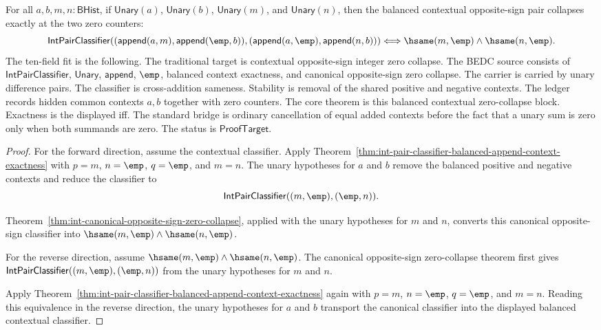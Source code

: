 \begin{theorem}
\label{thm:int-balanced-contextual-opposite-sign-zero-collapse}
For all $a,b,m,n:\mathsf{BHist}$, if $\mathsf{Unary}(a)$,
$\mathsf{Unary}(b)$, $\mathsf{Unary}(m)$, and $\mathsf{Unary}(n)$, then
the balanced contextual opposite-sign pair collapses exactly at the two zero
counters:
$$
\mathsf{IntPairClassifier}
((\mathsf{append}(a,m),\mathsf{append}(\emp,b)),
(\mathsf{append}(a,\emp),\mathsf{append}(n,b)))
\Longleftrightarrow
\hsame(m,\emp)\land\hsame(n,\emp).
$$
The ten-field fit is the following. The traditional target is contextual
opposite-sign integer zero collapse. The BEDC source consists of
$\mathsf{IntPairClassifier}$, $\mathsf{Unary}$, $\mathsf{append}$, $\emp$,
balanced context exactness, and canonical opposite-sign zero collapse. The
carrier is carried by unary difference pairs. The classifier is
cross-addition sameness. Stability is removal of the shared positive and
negative contexts. The ledger records hidden common contexts $a,b$ together
with zero counters. The core theorem is this balanced contextual zero-collapse
block. Exactness is the displayed iff. The standard bridge is ordinary
cancellation of equal added contexts before the fact that a unary sum is zero
only when both summands are zero. The status is $\mathsf{ProofTarget}$.
\end{theorem}
\begin{proof}
For the forward direction, assume the contextual classifier. Apply
Theorem~\ref{thm:int-pair-classifier-balanced-append-context-exactness} with
$p=m$, $n=\emp$, $q=\emp$, and $m=n$. The unary hypotheses for $a$ and $b$
remove the balanced positive and negative contexts and reduce the classifier to
$$
\mathsf{IntPairClassifier}((m,\emp),(\emp,n)).
$$

Theorem~\ref{thm:int-canonical-opposite-sign-zero-collapse}, applied with the
unary hypotheses for $m$ and $n$, converts this canonical opposite-sign
classifier into $\hsame(m,\emp)\land\hsame(n,\emp)$.

For the reverse direction, assume
$\hsame(m,\emp)\land\hsame(n,\emp)$. The canonical
opposite-sign zero-collapse theorem first gives
$\mathsf{IntPairClassifier}((m,\emp),(\emp,n))$ from the unary hypotheses for
$m$ and $n$.

Apply Theorem~\ref{thm:int-pair-classifier-balanced-append-context-exactness}
again with $p=m$, $n=\emp$, $q=\emp$, and $m=n$. Reading this equivalence in
the reverse direction, the unary hypotheses for $a$ and $b$ transport the
canonical classifier into the displayed balanced contextual classifier.
\end{proof}

